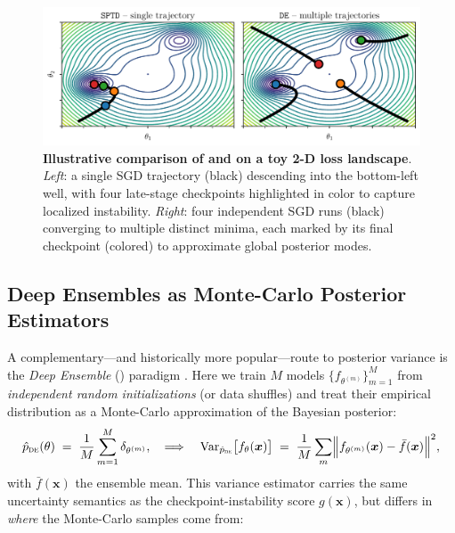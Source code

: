 \begin{figure}[t]
    \centering
    \includegraphics[width=\linewidth]{figs/sptd/sptd_de.pdf}
    \caption{\textbf{Illustrative comparison of \sptd and \de on a toy 2-D loss landscape}. \textit{Left}: a single SGD trajectory (black) descending into the bottom-left well, with four late-stage checkpoints highlighted in color to capture localized instability. \textit{Right}: four independent SGD runs (black) converging to multiple distinct minima, each marked by its final checkpoint (colored) to approximate global posterior modes.
}
    \label{fig:sptd_de_traj}
\end{figure}

\subsection{Deep Ensembles as Monte-Carlo Posterior Estimators}
\label{ssec:deep_ensembles_theory}

A complementary—and historically more popular—route to posterior variance is the \emph{Deep Ensemble} (\de) paradigm \citep{lakshminarayanan2017simple}.  
Here we train $M$ models $\{f_{\theta^{(m)}}\}_{m=1}^{M}$ from \emph{independent random initializations} (or data shuffles) and treat their empirical distribution as a Monte-Carlo approximation of the Bayesian posterior:
\begin{equation}
  \hat{p}_{\textsc{de}}(\theta)
  \;=\;
  \frac1M\sum_{m=1}^{M}\delta_{\theta^{(m)}}, 
  \quad\Longrightarrow\quad
  \operatorname{Var}_{\hat{p}_{\textsc{de}}}\bigl[f_{\theta}(\bm{x})\bigr]
  \;=\;
  \frac1M\sum_{m}\Bigl\lVert
      f_{\theta^{(m)}}(\bm{x})
      - \bar{f}(\bm{x})
  \Bigr\rVert^{2},
\end{equation}
with $\bar{f}(\bm{x})$ the ensemble mean.  
This variance estimator carries the same uncertainty semantics as the checkpoint-instability score $g(\bm{x})$, but differs in \emph{where} the Monte-Carlo samples come from:

